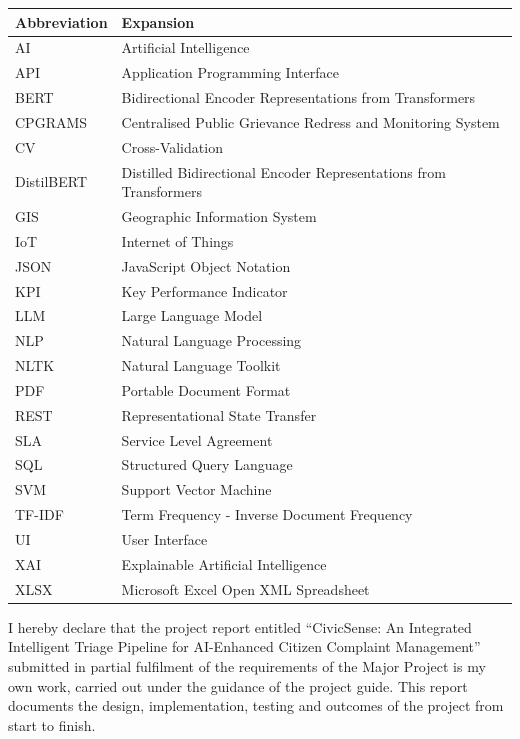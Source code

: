 \documentclass[10pt,letterpaper,oneside]{article}\usepackage{geometry}\geometry{top=1in,bottom=1in,left=1in,right=1in,includeheadfoot}\usepackage{xcolor}\definecolor{color@navy}{HTML}{1F3B63}\definecolor{color@grey}{HTML}{404040}\definecolor{color@hdr}{HTML}{F2F4F7}\usepackage{titlesec}\titleformat{\section}  {\normalfont\huge\bfseries\color@navy}  {}{0pt}{\MakeUppercase}\titleformat{\subsection}  {\normalfont\Large\bfseries\color@navy}  {}{0pt}{}\titleformat{\subsubsection}  {\normalfont\large\bfseries\color@navy}  {}{0pt}{}\titlespacing*{\section}{0pt}{14pt}{6pt}\titlespacing*{\subsection}{0pt}{10pt}{4pt}\titlespacing*{\subsubsection}{0pt}{8pt}{3pt}\setlength{\parindent}{0pt}\setlength{\parskip}{0.6em}\parindent=0pt\usepackage{enumitem}\setlist{nosep,leftmargin=*,itemsep=0pt,topsep=2pt,partopsep=0pt}\usepackage{array}\usepackage{booktabs}\usepackage{caption}\captionsetup{font={small,it},labelfont={bf},labelsep=period,  parskip=2pt,skip=4pt,list=no}\captionsetup[table]{labelfont={bf,small,color@navy},name=Table}\usepackage{graphicx}\usepackage{verbatim}\usepackage{ragged2e}\usepackage{longtable}\usepackage{tabularx}\usepackage{multirow}\usepackage{colortbl}\definecolor{rowshade}{HTML}{F2F4F7}\usepackage{tikz}\usetikzlibrary{positioning,calc}\usepackage[hidelinks]{hyperref}\hypersetup{colorlinks=true,linkcolor=color@navy,urlcolor=color@navy}\pagestyle{fancy}\fancyhf{}\renewcommand{\headrulewidth}{0.4pt}\fancyhead[L]{\small\color@navy CivicSense — Project Report}\fancyhead[R]{\small\color@grey October 11, 2026}\fancyfoot[C]{\small\color@grey An Integrated Intelligent Triage Pipelin}\fancyfoot[R]{\small\color@grey Page \thepage}\usepackage{setspace}\setstretch{1.15}\AtBeginDocument{  \hypersetup{pdftitle={An Integrated Intelligent Triage Pipeline for AI-Enhanced Citizen Complaint Management},    pdfauthor={CivicSense Project Team},    pdfsubject={Project Report},    pdfkeywords={smart cities, NLP, complaint management, e-governance},    pdfcreator={CivicSense Project Team}  }}
\begin{document}
\begin{table}[htbp]
\centering
\small
\begin{tabular}{@{}ll@{}}
\toprule
Abbreviation & Expansion \\
\midrule
AI & Artificial Intelligence \\
API & Application Programming Interface \\
BERT & Bidirectional Encoder Representations from Transformers \\
CPGRAMS & Centralised Public Grievance Redress and Monitoring System \\
CV & Cross-Validation \\
DistilBERT & Distilled Bidirectional Encoder Representations from Transformers \\
GIS & Geographic Information System \\
IoT & Internet of Things \\
JSON & JavaScript Object Notation \\
KPI & Key Performance Indicator \\
LLM & Large Language Model \\
NLP & Natural Language Processing \\
NLTK & Natural Language Toolkit \\
PDF & Portable Document Format \\
REST & Representational State Transfer \\
SLA & Service Level Agreement \\
SQL & Structured Query Language \\
SVM & Support Vector Machine \\
TF-IDF & Term Frequency - Inverse Document Frequency \\
UI & User Interface \\
XAI & Explainable Artificial Intelligence \\
XLSX & Microsoft Excel Open XML Spreadsheet \\
\bottomrule
\end{tabular}
\end{table}
\newpage


\clearpage
{}

I hereby declare that the project report entitled “CivicSense: An Integrated Intelligent Triage Pipeline for AI-Enhanced Citizen Complaint Management” submitted in partial fulfilment of the requirements of the Major Project is my own work, carried out under the guidance of the project guide. This report documents the design, implementation, testing and outcomes of the project from start to finish.
\end{document}
